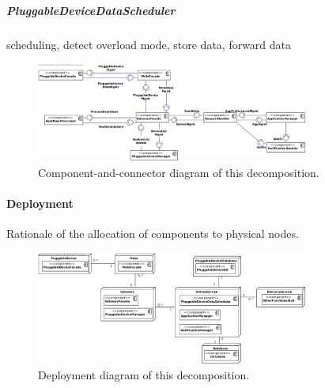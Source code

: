     \subparagraph{PluggableDeviceDataScheduler}
    scheduling, detect overload mode, store data, forward data

    \begin{figure}[!htp]
    	\centering
    	\includegraphics[width=0.8\textwidth]{component-diagram-1}
    	\caption{Component-and-connector diagram of this decomposition.}
        \label{fig:it1-cc_main}
    \end{figure}



    \paragraph{Deployment}
    Rationale of the allocation of components to physical nodes.

    \begin{figure}[!htp]
    	\centering
    	\includegraphics[width=0.8\textwidth]{deployment-diagram-1}
    	\caption{Deployment diagram of this decomposition.
    	}\label{fig:it1-depl_main}
    \end{figure}


